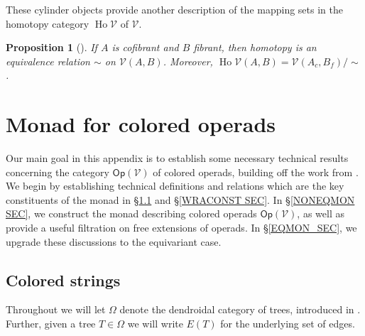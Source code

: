 \documentclass[a4paper,10pt
,draft
]{article}%
\numberwithin{equation}{section}
\numberwithin{figure}{section}
\newtheorem{proposition}[equation]{Proposition}%
\theoremstyle{definition} %
\newcommand{\Op}{\mathsf{Op}}%
\DeclareMathOperator{\Ho}{Ho}
\newcommand{\V}{\ensuremath{\mathcal V}}
\newcommand{\1}{\ensuremath{\mathbbm 1}}%
\begin{document}
These cylinder objects provide another description of the mapping sets in the homotopy category $\Ho \V$ of $\V$.

\begin{proposition}[{\cite[1.2.10]{Hov99}}]
      If $A$ is cofibrant and $B$ fibrant, then
      homotopy is an equivalence relation $\sim$ on $\V(A,B)$.
      Moreover, 
      $\Ho \V (A,B) = \V(A_c, B_f)/\sim$.
\end{proposition}
























\appendix


\section{Monad for colored operads}
\label{MONAD_APDX}


Our main goal in this appendix is to establish some necessary technical results concerning the category $\mathsf{Op}(\mathcal{V})$ of colored operads,
building off the work from \cite{BP_geo}.
We begin by establishing technical definitions and relations which are the key constituents of the monad in \S \ref{CSTRINGS_SEC} and \S \ref{WRACONST SEC}.
In \S \ref{NONEQMON SEC}, we construct the monad describing colored operads $\Op(\V)$, as well as provide a useful filtration on free extensions of operads.
In \S \ref{EQMON_SEC}, we upgrade these discussions to the equivariant case.




\subsection{Colored strings}
\label{CSTRINGS_SEC}


Throughout we will let $\Omega$ denote the dendroidal category of trees, introduced in \cite{MW07}.
Further, given a tree $T\in \Omega$ we will write 
$E(T)$ for the underlying set of edges.
\end{document}
